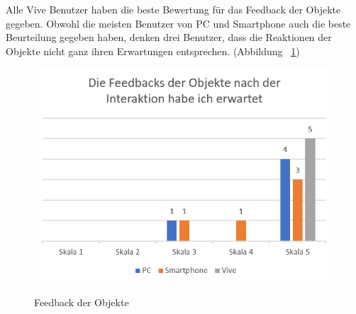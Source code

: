 Alle Vive Benutzer haben die beste Bewertung für das Feedback der Objekte gegeben. Obwohl die meisten Benutzer von PC und Smartphone auch die beste Beurteilung gegeben haben, denken drei Benutzer, dass die Reaktionen der Objekte nicht ganz ihren Erwartungen entsprechen. (Abbildung ~\ref{fig:feedbacksDerObjekte})

\begin{figure}[ht]
\vspace*{1em}
\centering
\caption{Feedback der Objekte}
\includegraphics[width= \textwidth]{images/feedbacksDerObjekte.png}
\label{fig:feedbacksDerObjekte} 
\end{figure}

